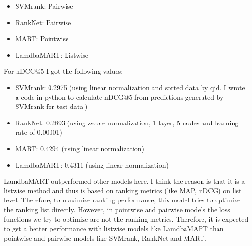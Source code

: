 \documentclass[11pt]{article}
\begin{document}
\begin{itemize}
\item SVMrank: Pairwise
\item RankNet: Pairwise
\item MART: Pointwise
\item LamdbaMART: Listwise
\end{itemize}
For nDCG@5 I got the following values:
\begin{itemize}
\item SVMrank: 0.2975 (using linear normalization and sorted data by qid. I wrote a code in python to calculate nDCG@5 from predictions generated by SVMrank for test data.)
\item RankNet: 0.2893 (using zscore normalization, 1 layer, 5 nodes and learning rate of 0.00001)
\item MART: 0.4294 (using linear normalization)
\item LamdbaMART: 0.4311 (using linear normalization)
\end{itemize}
LamdbaMART outperformed other models here. I think the reason is that it is a listwise method and thus is based on ranking metrics (like MAP, nDCG) on list level. Therefore, to maximize ranking performance, this model tries to optimize the ranking list directly. However, in pointwise and pairwise models the loss functions we try to optimize are not the ranking metrics. Therefore, it is expected to get a better performance with listwise models like LamdbaMART than pointwise and pairwise models like SVMrank, RankNet and MART. 
\end{document}
